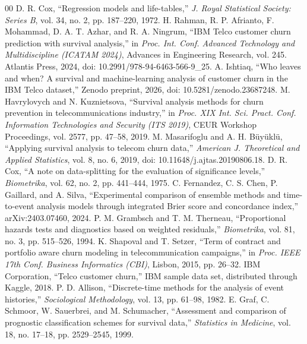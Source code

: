 \documentclass[conference]{IEEEtran}
\begin{document}
\begin{thebibliography}{00}
 D. R. Cox, ``Regression models and life-tables,'' \textit{J. Royal Statistical Society: Series B}, vol. 34, no. 2, pp. 187--220, 1972.
 H. Rahman, R. P. Afrianto, F. Mohammad, D. A. T. Azhar, and R. A. Ningrum, ``IBM Telco customer churn prediction with survival analysis,'' in \textit{Proc. Int. Conf. Advanced Technology and Multidiscipline (ICATAM 2024)}, Advances in Engineering Research, vol. 245. Atlantis Press, 2024, doi: 10.2991/978-94-6463-566-9\_25.
 A. Ishtiaq, ``Who leaves and when? A survival and machine-learning analysis of customer churn in the IBM Telco dataset,'' Zenodo preprint, 2026, doi: 10.5281/zenodo.23687248.
 M. Havrylovych and N. Kuznietsova, ``Survival analysis methods for churn prevention in telecommunications industry,'' in \textit{Proc. XIX Int. Sci. Pract. Conf. Information Technologies and Security (ITS 2019)}, CEUR Workshop Proceedings, vol. 2577, pp. 47--58, 2019.
 M. Masarifoglu and A. H. B\"uy\"ukl\"u, ``Applying survival analysis to telecom churn data,'' \textit{American J. Theoretical and Applied Statistics}, vol. 8, no. 6, 2019, doi: 10.11648/j.ajtas.20190806.18.
 D. R. Cox, ``A note on data-splitting for the evaluation of significance levels,'' \textit{Biometrika}, vol. 62, no. 2, pp. 441--444, 1975.
 C. Fernandez, C. S. Chen, P. Gaillard, and A. Silva, ``Experimental comparison of ensemble methods and time-to-event analysis models through integrated Brier score and concordance index,'' arXiv:2403.07460, 2024.
 P. M. Grambsch and T. M. Therneau, ``Proportional hazards tests and diagnostics based on weighted residuals,'' \textit{Biometrika}, vol. 81, no. 3, pp. 515--526, 1994.
 K. Shapoval and T. Setzer, ``Term of contract and portfolio aware churn modeling in telecommunication campaigns,'' in \textit{Proc. IEEE 17th Conf. Business Informatics (CBI)}, Lisbon, 2015, pp. 26--32.
 IBM Corporation, ``Telco customer churn,'' IBM sample data set, distributed through Kaggle, 2018.
 P. D. Allison, ``Discrete-time methods for the analysis of event histories,'' \textit{Sociological Methodology}, vol. 13, pp. 61--98, 1982.
 E. Graf, C. Schmoor, W. Sauerbrei, and M. Schumacher, ``Assessment and comparison of prognostic classification schemes for survival data,'' \textit{Statistics in Medicine}, vol. 18, no. 17--18, pp. 2529--2545, 1999.
\end{thebibliography}
\end{document}
